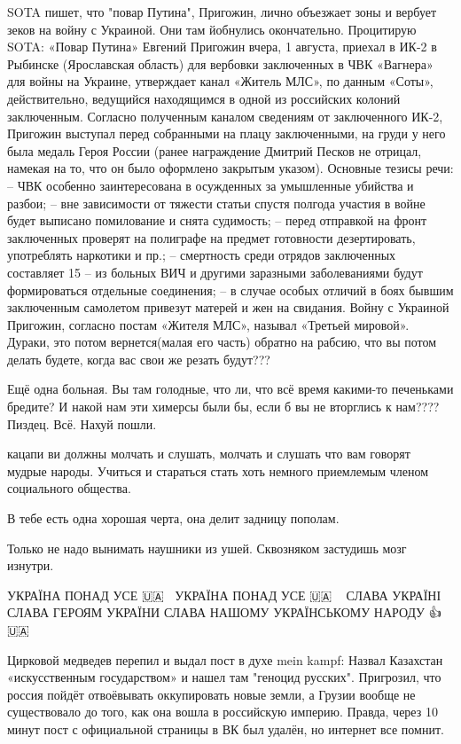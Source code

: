 SOTA пишет, что "повар Путина", Пригожин, лично объезжает зоны и вербует зеков на войну с Украиной. Они там йобнулись окончательно. Процитирую SOTA:
«Повар Путина» Евгений Пригожин вчера, 1 августа, приехал в ИК-2 в Рыбинске (Ярославская область) для вербовки заключенных в ЧВК «Вагнера» для войны на Украине, утверждает канал «Житель МЛС», по данным «Соты», действительно, ведущийся находящимся в одной из российских колоний заключенным.
Согласно полученным каналом сведениям от заключенного ИК-2, Пригожин выступал перед собранными на плацу заключенными, на груди у него была медаль Героя России (ранее награждение Дмитрий Песков не отрицал, намекая на то, что он было оформлено закрытым указом). Основные тезисы речи:
– ЧВК особенно заинтересована в осужденных за умышленные убийства и разбои;
– вне зависимости от тяжести статьи спустя полгода участия в войне будет выписано помилование и снята судимость;
– перед отправкой на фронт заключенных проверят на полиграфе на предмет готовности дезертировать, употреблять наркотики и пр.;
– смертность среди отрядов заключенных составляет 15%
– из больных ВИЧ и другими заразными заболеваниями будут формироваться отдельные соединения;
– в случае особых отличий в боях бывшим заключенным самолетом привезут матерей и жен на свидания.
Войну с Украиной Пригожин, согласно постам «Жителя МЛС», называл «Третьей мировой».
Дураки, это потом вернется(малая его часть) обратно на рабсию, что вы потом делать будете, когда вас свои же резать будут???

Ещё одна больная. Вы там голодные, что ли, что всё время какими-то печеньками
бредите? И накой нам эти химерсы были бы, если б вы не вторглись к нам????
Пиздец. Всё. Нахуй пошли.

кацапи ви должны молчать и слушать, молчать и слушать что вам говорят
мудрые народы. Учиться и стараться стать хоть немного приемлемым членом
социального общества.

В тебе есть одна хорошая черта, она делит задницу пополам.

Только не надо вынимать наушники из ушей. Сквозняком застудишь мозг изнутри.

УКРАЇНА ПОНАД УСЕ 🇺🇦💛💙 УКРАЇНА ПОНАД УСЕ 🇺🇦💛💙💞 СЛАВА УКРАЇНІ СЛАВА
ГЕРОЯМ УКРАЇНИ СЛАВА НАШОМУ УКРАЇНСЬКОМУ НАРОДУ 👍🇺🇦

Цирковой медведев перепил и выдал пост в духе mein kampf:
Назвал Казахстан «искусственным государством» и нашел там "геноцид русских". Пригрозил, что россия пойдёт отвоёвывать оккупировать новые земли, а Грузии вообще не существовало до того, как она вошла в российскую империю.
Правда, через 10 минут пост с официальной страницы в ВК был удалён, но интернет все помнит.

